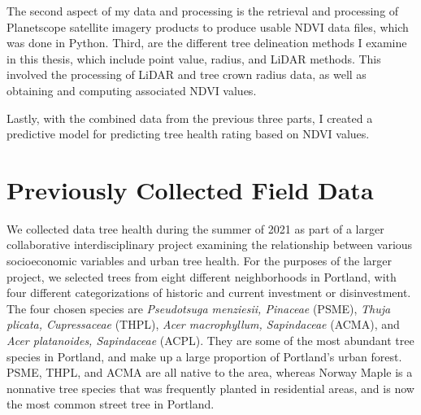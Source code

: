 \documentclass[12pt,twoside]{reedthesis}
\begin{document}
The second aspect of my data and processing is the retrieval and processing of Planetscope satellite imagery products to produce usable NDVI data files, which was done in Python. Third, are the different tree delineation methods I examine in this thesis, which include point value, radius, and LiDAR methods. This involved the processing of LiDAR and tree crown radius data, as well as obtaining and computing associated NDVI values.

Lastly, with the combined data from the previous three parts, I created a predictive model for predicting tree health rating based on NDVI values.

\hypertarget{previously-collected-field-data}{%
\section{Previously Collected Field Data}\label{previously-collected-field-data}}

We collected data tree health during the summer of 2021 as part of a larger collaborative interdisciplinary project examining the relationship between various socioeconomic variables and urban tree health. For the purposes of the larger project, we selected trees from eight different neighborhoods in Portland, with four different categorizations of historic and current investment or disinvestment. The four chosen species are \emph{Pseudotsuga menziesii, Pinaceae} (PSME), \emph{Thuja plicata, Cupressaceae} (THPL), \emph{Acer macrophyllum, Sapindaceae} (ACMA), and \emph{Acer platanoides, Sapindaceae} (ACPL). They are some of the most abundant tree species in Portland, and make up a large proportion of Portland's urban forest. PSME, THPL, and ACMA are all native to the area, whereas Norway Maple is a nonnative tree species that was frequently planted in residential areas, and is now the most common street tree in Portland.
\end{document}
